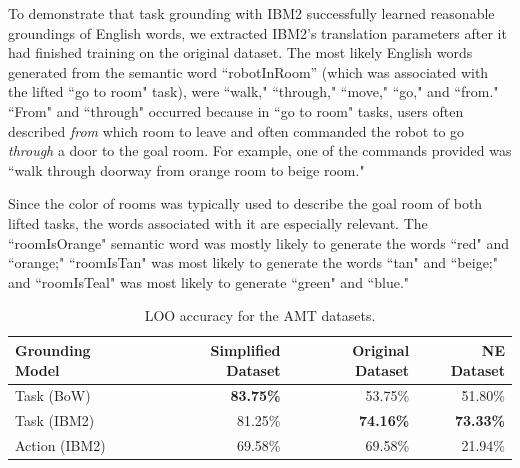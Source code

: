 \documentclass[conference]{IEEEtran}
\begin{document}

To demonstrate that task grounding with IBM2 successfully learned reasonable groundings of English words, we extracted IBM2's translation parameters after it had finished training on the original dataset. The most likely English words generated from the semantic word ``robotInRoom'' (which was associated with the lifted ``go to room" task), were ``walk," ``through," ``move," ``go," and ``from."  ``From" and ``through" occurred because in ``go to room" tasks, users often described {\em from} which room to leave and often commanded the robot to go {\em through} a door to the goal room. For example, one of the commands provided was ``walk through doorway from orange room to beige room."


Since the color of rooms was typically used to describe the goal room of both lifted tasks, the words associated with it are especially relevant. The ``roomIsOrange" semantic word was mostly likely to generate the words ``red" and ``orange;" ``roomIsTan" was most likely to generate the words ``tan" and ``beige;" and ``roomIsTeal" was most likely to generate ``green" and ``blue."



\begin{table}[tb]
\begin{center}
\begin{tabular}{@{}lrrr@{}} \toprule
Grounding Model & Simplified Dataset & Original Dataset & NE Dataset \\ \midrule
 Task (BoW) & {\bf 83.75\%} & 53.75\% & 51.80\%\\ 
 Task (IBM2) & 81.25\% & {\bf 74.16\%} & {\bf 73.33\%} \\ 
 Action (IBM2) & 69.58\% & 69.58\% & 21.94\% \\\bottomrule
\hline
 \end{tabular} 
 \caption{\small LOO accuracy for the AMT datasets.}
 \label{tab:res}
\end{center}
\end{table}
\end{document}
